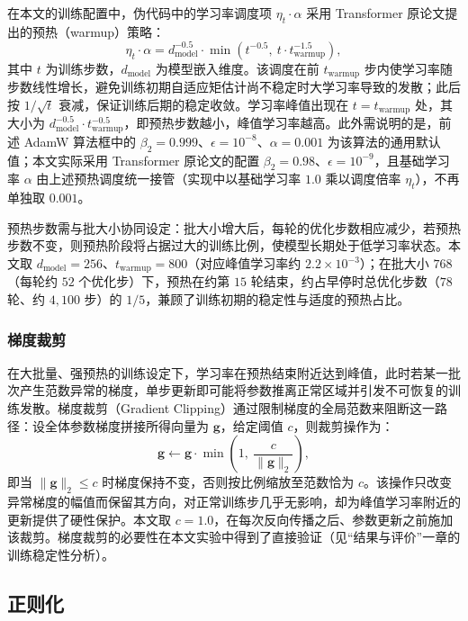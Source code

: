 在本文的训练配置中，伪代码中的学习率调度项 $\eta_t \cdot \alpha$ 采用 Transformer 原论文提出的预热（warmup）策略\supercite{vaswaniAttentionAllYou2017}：
\begin{equation}
    \eta_t \cdot \alpha = d_{\text{model}}^{-0.5} \cdot \min\left(t^{-0.5},\ t \cdot t_{\text{warmup}}^{-1.5}\right),
\end{equation}
其中 $t$ 为训练步数，$d_{\text{model}}$ 为模型嵌入维度。该调度在前 $t_{\text{warmup}}$ 步内使学习率随步数线性增长，避免训练初期自适应矩估计尚不稳定时大学习率导致的发散；此后按 $1/\sqrt{t}$ 衰减，保证训练后期的稳定收敛。学习率峰值出现在 $t = t_{\text{warmup}}$ 处，其大小为 $d_{\text{model}}^{-0.5} \cdot t_{\text{warmup}}^{-0.5}$，即预热步数越小，峰值学习率越高。此外需说明的是，前述 AdamW 算法框中的 $\beta_2=0.999$、$\epsilon=10^{-8}$、$\alpha=0.001$ 为该算法的通用默认值；本文实际采用 Transformer 原论文的配置 $\beta_2=0.98$、$\epsilon=10^{-9}$，且基础学习率 $\alpha$ 由上述预热调度统一接管（实现中以基础学习率 $1.0$ 乘以调度倍率 $\eta_t$），不再单独取 $0.001$。

预热步数需与批大小协同设定：批大小增大后，每轮的优化步数相应减少，若预热步数不变，则预热阶段将占据过大的训练比例，使模型长期处于低学习率状态。本文取 $d_{\text{model}}=256$、$t_{\text{warmup}}=800$（对应峰值学习率约 $2.2\times10^{-3}$）；在批大小 $768$（每轮约 $52$ 个优化步）下，预热在约第 $15$ 轮结束，约占早停时总优化步数（$78$ 轮、约 $4{,}100$ 步）的 $1/5$，兼顾了训练初期的稳定性与适度的预热占比。

\subsubsection{梯度裁剪}
在大批量、强预热的训练设定下，学习率在预热结束附近达到峰值，此时若某一批次产生范数异常的梯度，单步更新即可能将参数推离正常区域并引发不可恢复的训练发散。梯度裁剪（Gradient Clipping）通过限制梯度的全局范数来阻断这一路径：设全体参数梯度拼接所得向量为 $\boldsymbol{g}$，给定阈值 $c$，则裁剪操作为：
\begin{equation}
    \boldsymbol{g} \leftarrow \boldsymbol{g} \cdot \min\left(1,\ \frac{c}{\|\boldsymbol{g}\|_2}\right),
\end{equation}
即当 $\|\boldsymbol{g}\|_2 \le c$ 时梯度保持不变，否则按比例缩放至范数恰为 $c$。该操作只改变异常梯度的幅值而保留其方向，对正常训练步几乎无影响，却为峰值学习率附近的更新提供了硬性保护。本文取 $c=1.0$，在每次反向传播之后、参数更新之前施加该裁剪。梯度裁剪的必要性在本文实验中得到了直接验证（见“结果与评价”一章的训练稳定性分析）。

\subsection{正则化}
